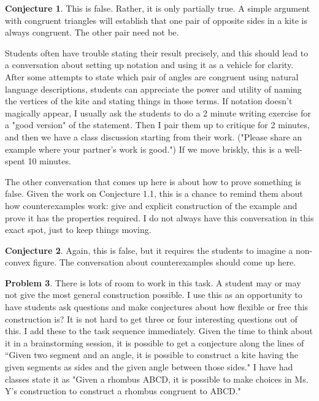 \documentclass{tufte-handout}
\theoremstyle{definition}
\newtheorem{problem}{Problem}[section]
\newtheorem{conjecture}[problem]{Conjecture}
\begin{document}
\begin{conjecture}
This is false. Rather, it is only partially true. A simple argument with congruent triangles will establish that one pair of opposite sides in a kite is always congruent. The other pair need not be. 

Students often have trouble stating their result precisely, and this should lead to a conversation about setting up notation and using it as a vehicle for clarity. After some attempts to state which pair of angles are congruent using natural language descriptions, students can appreciate the power and utility of naming the vertices of the kite and stating things in those terms. If notation doesn't magically appear, I usually ask the students to do a 2 minute writing exercise for a "good version" of the statement. Then I pair them up to critique for 2 minutes, and then we have a class discussion starting from their work. ("Please share an example where your partner's work is good.") If we move briskly, this is a well-spent 10 minutes.

The other conversation that comes up here is about how to prove something is false. Given the work on Conjecture 1.1, this is a chance to remind them about how counterexamples work: give and explicit construction of the example and prove it has the properties required. I do not always have this conversation in this exact spot, just to keep things moving.
\end{conjecture}

\begin{conjecture}
Again, this is false, but it requires the students to imagine a non-convex figure. The conversation about counterexamples should come up here. 
\end{conjecture}

\begin{problem}
There is lots of room to work in this task. A student may or may not give the most general construction possible. I use this as an opportunity to have students ask questions and make conjectures about how flexible or free this construction is? It is not hard to get three or four interesting questions out of this. I add these to the task sequence immediately. Given the time to think about it in a brainstorming session, it is possible to get a conjecture along the lines of ``Given two segment and an angle, it is possible to construct a kite having the given segments as sides and the given angle between those sides." I have had classes state it as "Given a rhombus ABCD, it is possible to make choices in Ms. Y's construction to construct a rhombus congruent to ABCD."
\end{problem}
\end{document}
